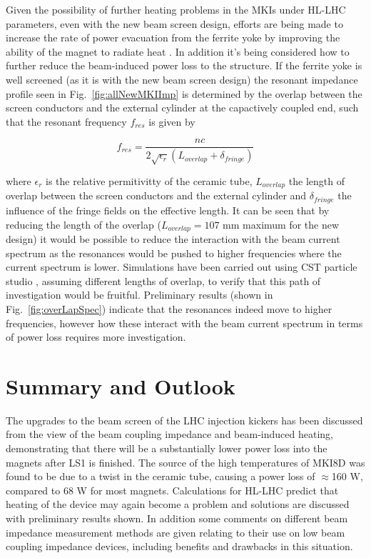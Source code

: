 \documentclass[a4paper,
              ]{jacow}
\begin{document}
Given the possibility of further heating problems in the MKIs under HL-LHC parameters, even with the new beam screen design, efforts are being made to increase the rate of power evacuation from the ferrite yoke by improving the ability of the magnet to radiate heat \cite{mkiCoolling}. In addition it's being considered how to further reduce the beam-induced power loss to the structure. If the ferrite yoke is well screened (as it is with the new beam screen design) the resonant impedance profile seen in Fig.~\ref{fig:allNewMKIImp} is determined by the overlap between the screen conductors and the external cylinder at the capactively coupled end, such that the resonant frequency $f_{res}$ is given by

\begin{equation}
f_{res} = \frac{n c}{2 \sqrt{\epsilon_{r}}\left( L_{overlap} + \delta_{fringe} \right)}
\end{equation}

where $\epsilon_{r}$ is the relative permitivitty of the ceramic tube, $L_{overlap}$ the length of overlap between the screen conductors and the external cylinder and $\delta_{fringe}$ the influence of the fringe fields on the effective length. It can be seen that by reducing the length of the overlap ($L_{overlap}=107$ mm maximum for the new design) it would be possible to reduce the interaction with the beam current spectrum as the resonances would be pushed to higher frequencies where the current spectrum is lower. Simulations have been carried out using CST particle studio \cite{cst-cite}, assuming different lengths of overlap, to verify that this path of investigation would be fruitful. Preliminary results (shown in Fig.~\ref{fig:overLapSpec}) indicate that the resonances indeed move to higher frequencies, however how these interact with the beam current spectrum in terms of power loss requires more investigation.

\section{Summary and Outlook}

The upgrades to the beam screen of the LHC injection kickers has been discussed from the view of the beam coupling impedance and beam-induced heating, demonstrating that there will be a substantially lower power loss into the magnets after LS1 is finished. The source of the high temperatures of MKI8D was found to be due to a twist in the ceramic tube, causing a power loss of $\approx$160 W, compared to 68 W for most magnets. Calculations for HL-LHC predict that heating of the device may again become a problem and solutions are discussed with preliminary results shown. In addition some comments on different beam impedance measurement methods are given relating to their use on low beam coupling impedance devices, including benefits and drawbacks in this situation.
\end{document}
